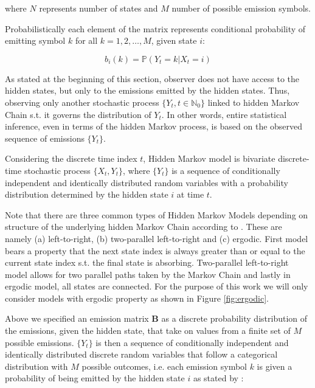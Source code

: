 \noindent where $N$ represents number of states and $M$ number of possible emission symbols.

Probabilistically each element of the matrix represents conditional probability of emitting symbol $k$ for all $k = 1,2,\ldots,M$, given state $i$: 

\begin{equation}
    b_{i}(k) = \mathbb{P}(Y_t = k|X_t = i) 
\end{equation}

As stated at the beginning of this section, observer does not have access to the hidden states, but only to the emissions emitted by the hidden states. 
Thus, observing only another stochastic process $\{Y_t, t \in \mathbb{N}_0\}$ linked to hidden Markov Chain s.t. it governs the distribution of $Y_t$. 
In other words, entire statistical inference, even in terms of the hidden Markov process, is based on the observed sequence of emissions $\{Y_t\}$.

Considering the discrete time index $t$, Hidden Markov model is bivariate discrete-time stochastic process $\{X_t,Y_t\}$, where $\{Y_t\}$ is a sequence of conditionally 
independent and identically distributed random variables with a probability distribution determined by the hidden state $i$ at time $t$. \cite{Rabiner1989}

Note that there are three common types of Hidden Markov Models depending on structure of the underlying hidden Markov Chain according to \cite{Nelwamondo2006}. These are namely (a) left-to-right, 
(b) two-parallel left-to-right and (c) ergodic. First model bears a property that the next state index is always greater than or equal to the current state index s.t. the final state is absorbing.
Two-parallel left-to-right model allows for two parallel paths taken by the Markov Chain and lastly in ergodic model, all states are connected.
For the purpose of this work we will only consider models with ergodic property as shown in Figure \ref{fig:ergodic}.

Above we specified an emission matrix $\textbf{B}$ as a discrete probability distribution of the emissions, given the hidden state, that take on values from a finite set of $M$ possible emissions. $\{Y_t\}$ is then a sequence of conditionally 
independent and identically distributed discrete random variables that follow a categorical distribution with $M$ possible outcomes, i.e. each emission symbol $k$ is given a probability of being emitted by the hidden state $i$
 as stated by \cite{Paisley2009}:


